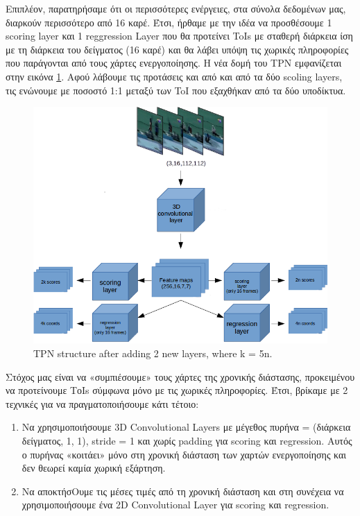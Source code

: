 \documentclass{report}
\begin{document}
Επιπλέον, παρατηρήσαμε ότι οι περισσότερες ενέργειες, στα σύνολα δεδομένων μας, διαρκούν περισσότερο από 16 καρέ. Έτσι, ήρθαμε με την ιδέα να προσθέσουμε 1 scoring layer και 1 reggression Layer
που θα προτείνει ToIs με σταθερή διάρκεια ίση με τη διάρκεια του δείγματος (16 καρέ) και θα λάβει υπόψη τις χωρικές πληροφορίες που παράγονται από τους χάρτες ενεργοποίησης.
Η νέα δομή του TPN εμφανίζεται στην εικόνα \ref{fig:tpn_1_2}. Αφού λάβουμε τις προτάσεις και από και από τα δύο scoling layers, τις ενώνουμε με ποσοστό 1:1 μεταξύ των ToI που
εξαχθήκαν από τα δύο υποδίκτυα.
\begin{figure}[h]
  \centering
  \includegraphics[scale=0.5]{tpn_1_2}
  \caption{TPN structure after adding 2 new layers, where k = 5n.}
  \label{fig:tpn_1_2}
\end{figure}
Στόχος μας είναι να «συμπιέσουμε» τους χάρτες της χρονικής διάστασης, προκειμένου να προτείνουμε ΤοΙs σύμφωνα μόνο με τις χωρικές πληροφορίες.
Έτσι, βρίκαμε με 2 τεχνικές για να πραγματοποιήσουμε κάτι τέτοιο:
\begin{enumerate}
\item Να χρησιμοποιήσουμε  3D Convolutional Layers με μέγεθος πυρήνα = (διάρκεια δείγματος, 1, 1), stride = 1 και χωρίς padding για scoring και regression.
  Αυτός ο πυρήνας «κοιτάει» μόνο στη χρονική διάσταση των χαρτών ενεργοποίησης και δεν θεωρεί καμία χωρική εξάρτηση.
\item Nα αποκτήσΟυμε τις μέσες τιμές από τη χρονική διάσταση και στη συνέχεια να χρησιμοποιήσουμε ένα 2D Convolutional Layer για scoring και regression.
\end{enumerate}
\end{document}
